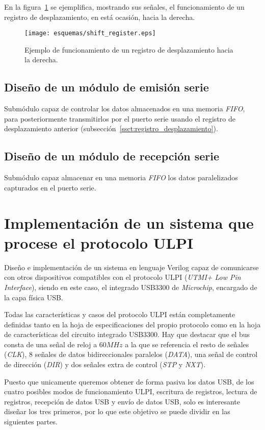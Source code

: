 En la figura~\ref{fig:shift_ejemplo} se ejemplifica, mostrando sus señales, el funcionamiento de un registro de desplazamiento, en está ocasión, hacia la derecha.

\begin{figure}[htb]
    \centering
    \texttt{[image: esquemas/shift\_register.eps]}
    \caption{Ejemplo de funcionamiento de un registro de desplazamiento hacia la derecha.}
    \label{fig:shift_ejemplo}
\end{figure}

\subsection{Diseño de un módulo de emisión serie}
Submódulo capaz de controlar los datos almacenados en una memoria \emph{FIFO}, para posteriormente transmitirlos por el puerto serie usando el registro de desplazamiento anterior (subsección~\ref{ssct:registro_desplazamiento}).

\subsection{Diseño de un módulo de recepción serie}
Submódulo capaz almacenar en una memoria \emph{FIFO} los datos paralelizados capturados en el puerto serie.



\section{Implementación de un sistema que procese el protocolo ULPI}
Diseño e implementación de un sistema en lenguaje Verilog capaz de comunicarse con otros dispositivos compatibles con el protocolo ULPI (\emph{UTMI+ Low Pin Interface}), siendo en este caso, el integrado USB3300 de \emph{Microchip}, encargado de la capa física USB.

Todas las características y casos del protocolo ULPI están completamente definidas tanto en la hoja de especificaciones del propio protocolo\cite{ulpi-specs} como en la hoja de características del circuito integrado USB3300\cite{microchip:usb3300}. Hay que destacar que el bus consta de una señal de reloj a $60MHz$ a la que se referencia el resto de señales (\emph{CLK}), 8 señales de datos bidireccionales paralelos (\emph{DATA}), una señal de control de dirección (\emph{DIR}) y dos señales extra de control (\emph{STP} y \emph{NXT}).

Puesto que unicamente queremos obtener de forma pasiva los datos USB, de los cuatro posibles modos de funcionamiento ULPI, escritura de registros, lectura de registros, recepción de datos USB y envío de datos USB, solo es interesante diseñar los tres primeros, por lo que este objetivo se puede dividir en las siguientes partes.

